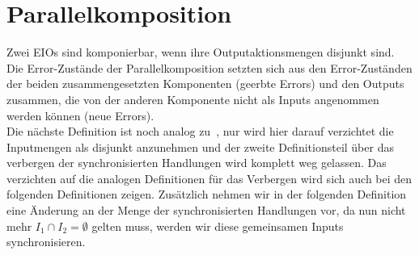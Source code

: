 \section{Parallelkomposition}
Zwei EIOs sind komponierbar, wenn ihre Outputaktionsmengen disjunkt sind. Die
Error-Zustände der Parallelkomposition setzten sich aus den Error-Zuständen der
beiden zusammengesetzten Komponenten (geerbte Errors) und den Outputs zusammen, die von der
anderen Komponente nicht als Inputs angenommen werden können (neue Errors).\\
Die nächste Definition ist noch analog zu~\cite{Vogler2014EIO}, nur wird hier
darauf verzichtet die Inputmengen als disjunkt anzunehmen und der zweite
Definitionsteil über das verbergen der synchronisierten Handlungen wird
komplett weg gelassen. Das verzichten auf die analogen Definitionen für das
Verbergen wird sich auch bei den folgenden Definitionen zeigen. Zusätzlich
nehmen wir in der folgenden Definition eine Änderung an der Menge der
synchronisierten Handlungen vor, da nun nicht mehr $I_1\cap I_2 =\emptyset$
gelten muss, werden wir diese gemeinsamen Inputs synchronisieren.

